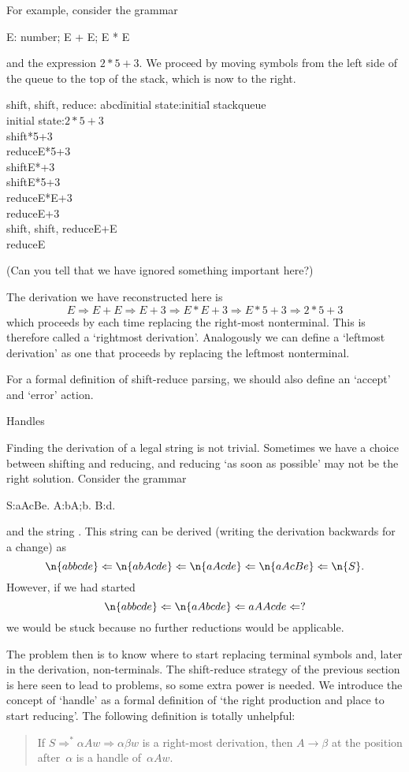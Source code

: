 For example, consider the grammar
\begin{bnf}
E: number; E + E; E * E
\end{bnf}
and the expression $2*5+3$. We proceed by moving symbols from the left
side of the queue to the top of the stack, which is now to the right.
\begin{tabbing}
shift, shift, reduce: abcd\=initial state:initial\=\kill
\>stack\>queue\\
initial state:\>\>$2*5+3$\\
shift\>*5+3\\
reduce\>E\>*5+3\\
shift\>E*+3\\
shift\>E*5\>+3\\
reduce\>E*E\>+3\\
reduce\>E\>+3\\
shift, shift, reduce\>E+E\\
reduce\>E\\
\end{tabbing}
(Can you tell that we have ignored something important here?)

The derivation we have reconstructed here is
\[ E\Rightarrow E+E\Rightarrow E+3\Rightarrow E*E+3
    \Rightarrow E*5+3\Rightarrow 2*5+3 \]
which proceeds by each time replacing the right-most
nonterminal. This is therefore called a `rightmost derivation'. Analogously we can define a
`leftmost derivation' as one that proceeds
by replacing the leftmost nonterminal.

For a formal definition of shift-reduce parsing, we should also define
an `accept' and `error' action.

 {Handles}

Finding the derivation of a legal string is not trivial. Sometimes we
have a choice between shifting and reducing, and reducing `as soon as
possible' may not be the right solution. Consider the grammar
\begin{bnf}
S:aAcBe.
A:bA;b.
B:d.
\end{bnf}
and the string . This string can be derived (writing the
derivation backwards for a change) as
\[ \n{abbcde}\Leftarrow\n{abAcde}\Leftarrow\n{aAcde}\Leftarrow
    \n{aAcBe}\Leftarrow\n{S}. \]
However, if we had started
\[ \n{abbcde}\Leftarrow\n{aAbcde}\Leftarrow aAAcde \Leftarrow ? \]
we would be stuck because no further reductions would be applicable.

The problem then is to know where to start replacing terminal symbols
and, later in the derivation, non-terminals. The shift-reduce strategy
of the previous section is here seen to lead to problems, so some
extra power is needed. We introduce the concept of
`handle' as a formal definition of `the right production
and place to start reducing'. The following definition is totally
unhelpful:
\begin{quotation} If $S\Rightarrow^*\alpha Aw\Rightarrow\alpha\beta w$ is a
  right-most derivation, then $A\rightarrow\beta$ at the position
  after~$\alpha$ is a handle of~$\alpha Aw$.
\end{quotation}

